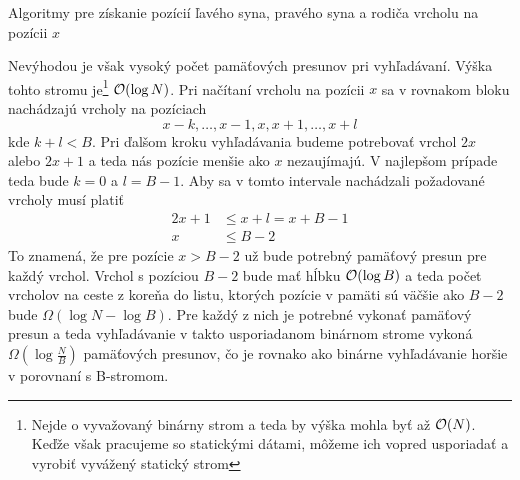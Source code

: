 \begin{algorithm}[H]
	\caption{Algoritmy pre získanie pozícií ľavého syna, pravého syna a rodiča vrcholu na pozícii $x$}
    \label{alg:naive_indexing}
	\begin{minipage}[t]{0.3\textwidth}
	    \begin{algorithmic}[1]
	            \State {}
	        \EndFunction
	    \end{algorithmic}
	\end{minipage} \hfill
	\begin{minipage}[t]{0.3\textwidth}
	    \begin{algorithmic}[1]
	            \State {}
	        \EndFunction
	    \end{algorithmic}
	\end{minipage} \hfill
	\begin{minipage}[t]{0.3\textwidth}
	    \begin{algorithmic}[1]
	            \State {}
	        \EndFunction
	    \end{algorithmic}
	\end{minipage}
\end{algorithm}

Nevýhodou je však vysoký počet pamäťových presunov pri vyhľadávaní. Výška tohto stromu je\footnote{Nejde o vyvažovaný binárny strom a teda by výška mohla byť až $\mathcal{O}(N)$. Keďže však pracujeme so statickými dátami, môžeme ich vopred usporiadať a vyrobiť vyvážený statický strom} $\mathcal{O}(\log{N})$. Pri načítaní vrcholu na pozícii $x$ sa v rovnakom bloku nachádzajú vrcholy na pozíciach
\[
x-k,\dotsc,x-1,x,x+1,\dotsc,x+l
\]
kde $k+l<B$. Pri ďalšom kroku vyhľadávania budeme potrebovať vrchol $2x$ alebo $2x+1$ a teda nás pozície menšie ako $x$ nezaujímajú. V najlepšom prípade teda bude $k=0$ a $l=B-1$. Aby sa v tomto intervale nachádzali požadované vrcholy musí platiť
\[
\begin{aligned}
2x+1 &\le x+l = x+B-1 \\
x &\le B-2
\end{aligned}
\]
To znamená, že pre pozície $x > B - 2$ už bude potrebný pamäťový presun pre každý vrchol. Vrchol s pozíciou $B-2$ bude mať hĺbku $\mathcal{O}(\log{B})$ a teda počet vrcholov na ceste z koreňa do listu, ktorých pozície v pamäti sú väčšie ako $B-2$ bude $\Omega(\log{N}-\log{B})$. Pre každý z nich je potrebné vykonať pamäťový presun a teda vyhľadávanie v takto usporiadanom binárnom strome vykoná $\Omega(\log{\frac{N}{B}})$ pamäťových presunov, čo je rovnako ako binárne vyhľadávanie horšie v porovnaní s \aware B-stromom.

